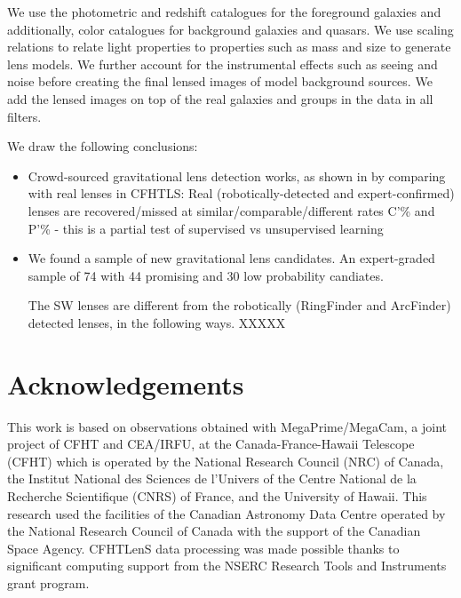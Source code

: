 \documentclass[useAMS,usenatbib,a4paper]{mn2e}
\begin{document}
We use the photometric and redshift catalogues for the foreground galaxies and
additionally, color catalogues for background galaxies and quasars. We
use scaling relations to relate light properties to properties such as mass and
size to generate lens models. We further account for the
instrumental effects such as seeing and noise before creating the final lensed
images of model background sources. We add the lensed images on top of the real
galaxies and groups in the \cfhtls data in all filters.

We draw the following conclusions:

\begin{itemize} 

\item Crowd-sourced gravitational lens detection works, as shown in by comparing with real lenses in CFHTLS:
Real (robotically-detected and expert-confirmed) lenses are
recovered/missed at similar/comparable/different rates C’\% and P’\% - this is a partial test of supervised vs unsupervised learning


\item We found a sample of new gravitational lens candidates. An
expert-graded sample of 74 with 44 promising and 30 low probability
candiates.

The SW lenses are different from the robotically (RingFinder and ArcFinder) detected lenses, in the following ways.
XXXXX


\end{itemize}



\section*{Acknowledgements}
 

This work is based on observations obtained with MegaPrime/MegaCam, a joint
project of CFHT and CEA/IRFU, at the Canada-France-Hawaii Telescope (CFHT) which
is operated by the National Research Council (NRC) of Canada, the Institut
National des Sciences de l'Univers of the Centre National de la Recherche
Scientifique (CNRS) of France, and the University of Hawaii. This research used
the facilities of the Canadian Astronomy Data Centre operated by the National
Research Council of Canada with the support of the Canadian Space Agency.
CFHTLenS data processing was made possible thanks to significant computing
support from the NSERC Research Tools and Instruments grant program.
\end{document}
